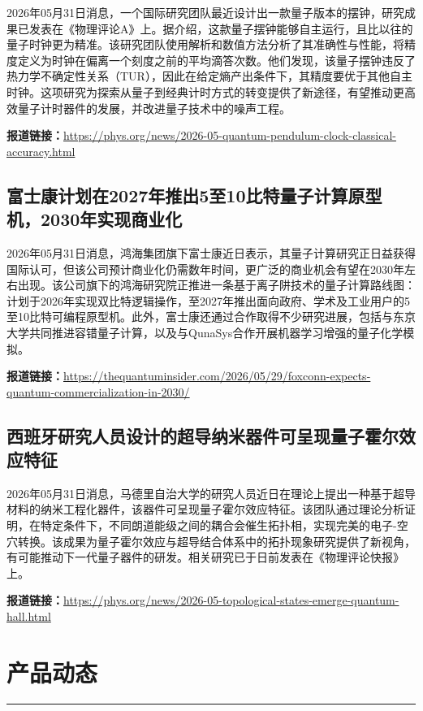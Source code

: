 \documentclass[12pt,a4paper]{ctexart}
\begin{document}
2026年05月31日消息，一个国际研究团队最近设计出一款量子版本的摆钟，研究成果已发表在《物理评论A》上。据介绍，这款量子摆钟能够自主运行，且比以往的量子时钟更为精准。该研究团队使用解析和数值方法分析了其准确性与性能，将精度定义为时钟在偏离一个刻度之前的平均滴答次数。他们发现，该量子摆钟违反了热力学不确定性关系（TUR），因此在给定熵产出条件下，其精度要优于其他自主时钟。这项研究为探索从量子到经典计时方式的转变提供了新途径，有望推动更高效量子计时器件的发展，并改进量子技术中的噪声工程。

\noindent\textbf{报道链接：}\url{https://phys.org/news/2026-05-quantum-pendulum-clock-classical-accuracy.html}

\subsection{ 富士康计划在2027年推出5至10比特量子计算原型机，2030年实现商业化 }

2026年05月31日消息，鸿海集团旗下富士康近日表示，其量子计算研究正日益获得国际认可，但该公司预计商业化仍需数年时间，更广泛的商业机会有望在2030年左右出现。该公司旗下的鸿海研究院正推进一条基于离子阱技术的量子计算路线图：计划于2026年实现双比特逻辑操作，至2027年推出面向政府、学术及工业用户的5至10比特可编程原型机。此外，富士康还通过合作取得不少研究进展，包括与东京大学共同推进容错量子计算，以及与QunaSys合作开展机器学习增强的量子化学模拟。

\noindent\textbf{报道链接：}\url{https://thequantuminsider.com/2026/05/29/foxconn-expects-quantum-commercialization-in-2030/}

\subsection{ 西班牙研究人员设计的超导纳米器件可呈现量子霍尔效应特征 }

2026年05月31日消息，马德里自治大学的研究人员近日在理论上提出一种基于超导材料的纳米工程化器件，该器件可呈现量子霍尔效应特征。该团队通过理论分析证明，在特定条件下，不同朗道能级之间的耦合会催生拓扑相，实现完美的电子-空穴转换。该成果为量子霍尔效应与超导结合体系中的拓扑现象研究提供了新视角，有可能推动下一代量子器件的研发。相关研究已于日前发表在《物理评论快报》上。

\noindent\textbf{报道链接：}\url{https://phys.org/news/2026-05-topological-states-emerge-quantum-hall.html}


\newpage
\section{产品动态}
\vspace{-0.5em}
\noindent\rule{\linewidth}{1.5pt}
\end{document}
